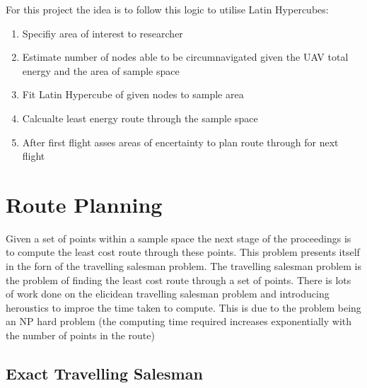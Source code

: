 \documentclass[a4paper,12pt,twoside]{article}
\begin{document}
For this project the idea is to follow this logic to utilise Latin Hypercubes:

\begin{enumerate}
\item Specifiy area of interest to researcher
\item Estimate number of nodes able to be circumnavigated given the UAV total energy and the area of sample space
\item Fit Latin Hypercube of given nodes to sample area
\item Calcualte least energy route through the sample space
\item After first flight asses areas of encertainty to plan route through for next flight

\end{enumerate}

\section{Route Planning}
\label{sec:route_planning}

Given a set of points within a sample space the next stage of the proceedings is to compute the least cost route through these points. This problem presents itself in the forn of the travelling salesman problem. The travelling salesman problem is the problem of finding the least cost route through a set of points. There is lots of work done on the elicidean travelling salesman problem and introducing heroustics to improe the time taken to compute. This is due to the problem being an NP hard problem (the computing time required increases exponentially with the number of points in the route)

\subsection{Exact Travelling Salesman}
\label{sec:exact_travelling_salesman}
\end{document}
